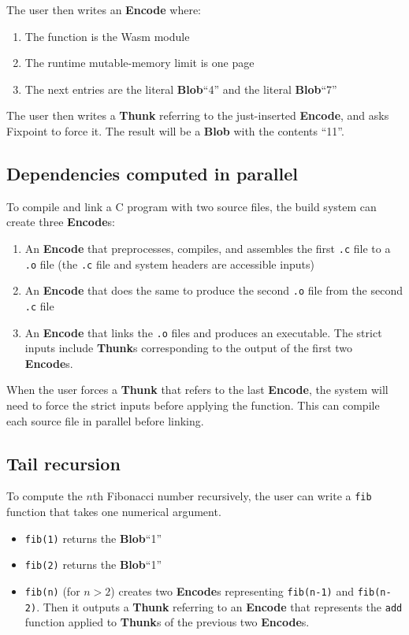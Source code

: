 \documentclass{article}
\newcommand{\blob}{\textbf{Blob}\xspace}
\newcommand{\encode}{\textbf{Encode}\xspace}
\newcommand{\thunk}{\textbf{Thunk}\xspace}
\newcommand{\thunks}{\textbf{Thunk}s\xspace}
\newcommand{\encodes}{\textbf{Encode}s\xspace}
\newcommand{\bs}{\vspace{\baselineskip}}
\begin{document}
\bs

The user then writes an \encode where:
\begin{enumerate}[itemsep=0pt]
\item The function is the Wasm module
\item The runtime mutable-memory limit is one page
\item The next entries are the literal \blob ``4'' and the literal \blob ``7''
\end{enumerate}

The user then writes a \thunk referring to the just-inserted \encode,
and asks Fixpoint to force it. The result will be a \blob with the
contents ``11''.

\subsection{Dependencies computed in parallel} To compile and link a C program with two source files,
the build system can create three \encodes:
\begin{enumerate}[itemsep=0pt]
\item An \encode that preprocesses, compiles, and assembles the first \texttt{.c} file to a \texttt{.o} file
  (the \texttt{.c} file and system headers are accessible inputs)
\item An \encode that does the same to produce the second \texttt{.o} file from the second \texttt{.c} file
\item An \encode that links the \texttt{.o} files and produces an executable. The strict inputs include \thunks corresponding to the output of the first two \encodes.
\end{enumerate}

When the user forces a \thunk that refers to the last \encode, the
system will need to force the strict inputs before applying the
function. This can compile each source file in parallel before
linking.

\subsection{Tail recursion} To compute the $n$th Fibonacci number
recursively, the user can write a \texttt{fib} function that
takes one numerical argument.
\begin{itemize}[itemsep=0pt]
\item \texttt{fib(1)} returns the \blob ``1''
\item \texttt{fib(2)} returns the \blob ``1''
  \item \texttt{fib(n)} (for $n>2$) creates two \encodes
    representing \texttt{fib(n-1)} and \texttt{fib(n-2)}.
    Then it outputs a \thunk referring to an \encode that represents
    the \texttt{add} function applied to \thunks of the previous two \encodes.
    \end{itemize}
\end{document}
